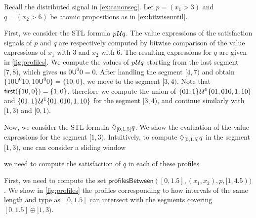 \begin{example}
	Recall the distributed signal in \cref{ex:canonseg}.
	Let $p = (x_1 > 3)$ and $q = (x_2 > 6)$ be atomic propositions as in \cref{ex:bitwiseuntil}.
		
	First, we consider the STL formula $p \kern.1em\mathcal{U} q$.
	The value expressions of the satisfaction signals of $p$ and $q$ are respectively computed by bitwise comparison of the value expressions of $x_1$ with 3 and $x_2$ with 6.
	The resulting expressions for $q$ are given in \cref{fig:profiles}.
	We compute the values of $p \kern.1em\mathcal{U} q$ starting from the last segment $[7,8)$, which gives us $0 \mathsf{U}^0 0 = 0$.
	After handling the segment $[4,7)$ and obtain $\{ 10 \mathsf{U}^0 10, 10 \mathsf{U}^0 0 \} = \{10, 0\}$, we move to the segment $[3,4)$.
	Note that $\textsf{first}(\{10, 0\}) = \{1,0\}$, therefore we compute the union of $\{01, 1\} \kern.1em\mathcal{U}^0 \{01, 010, 1, 10\}$ and $\{01, 1\} \kern.1em\mathcal{U}^1 \{01, 010, 1, 10\}$ for the segment $[3,4)$, and continue similarly with $[1,3)$ and $[0,1)$.
	
	Now, we consider the STL formula $\lozenge_{[0,1.5]} q$.
	We show the evaluation of the value expressions for the segment $[1,3)$.
	Intuitively, to compute $\lozenge_{[0,1.5]} q$ in the segment $[1,3)$, one can consider a sliding window 
	
	 we need to compute the satisfaction of $q$ in each of these profiles 
	
	First, we need to compute the set $\mathsf{profilesBetween}([0,1.5], (x_1, x_2), p, [1,4.5))$.
	We show in \cref{fig:profiles} the profiles corresponding to how intervals of the same length and type as $[0,1.5]$ can intersect with the segments covering $[0,1.5] \oplus [1,3)$.
	

\end{example}
